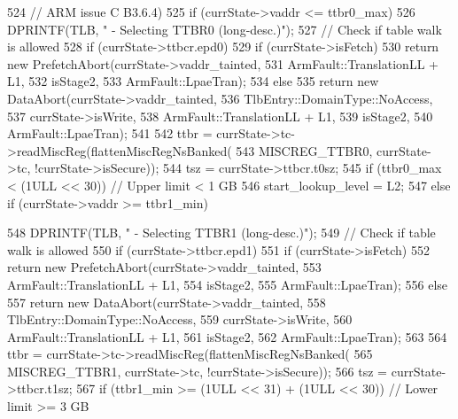 \begin{DoxyCode}
{{524         // ARM issue C B3.6.4)
525         if (currState->vaddr <= ttbr0_max) {
526             DPRINTF(TLB, " - Selecting TTBR0 (long-desc.)\n");
527             // Check if table walk is allowed
528             if (currState->ttbcr.epd0) {
529                 if (currState->isFetch)
530                     return new PrefetchAbort(currState->vaddr_tainted,
531                                              ArmFault::TranslationLL + L1,
532                                              isStage2,
533                                              ArmFault::LpaeTran);
534                 else
535                     return new DataAbort(currState->vaddr_tainted,
536                                          TlbEntry::DomainType::NoAccess,
537                                          currState->isWrite,
538                                          ArmFault::TranslationLL + L1,
539                                          isStage2,
540                                          ArmFault::LpaeTran);
541             }
542             ttbr = currState->tc->readMiscReg(flattenMiscRegNsBanked(
543                 MISCREG_TTBR0, currState->tc, !currState->isSecure));
544             tsz = currState->ttbcr.t0sz;
545             if (ttbr0_max < (1ULL << 30))  // Upper limit < 1 GB
546                 start_lookup_level = L2;
547         } else if (currState->vaddr >= ttbr1_min) {
548             DPRINTF(TLB, " - Selecting TTBR1 (long-desc.)\n");
549             // Check if table walk is allowed
550             if (currState->ttbcr.epd1) {
551                 if (currState->isFetch)
552                     return new PrefetchAbort(currState->vaddr_tainted,
553                                              ArmFault::TranslationLL + L1,
554                                              isStage2,
555                                              ArmFault::LpaeTran);
556                 else
557                     return new DataAbort(currState->vaddr_tainted,
558                                          TlbEntry::DomainType::NoAccess,
559                                          currState->isWrite,
560                                          ArmFault::TranslationLL + L1,
561                                          isStage2,
562                                          ArmFault::LpaeTran);
563             }
564             ttbr = currState->tc->readMiscReg(flattenMiscRegNsBanked(
565                 MISCREG_TTBR1, currState->tc, !currState->isSecure));
566             tsz = currState->ttbcr.t1sz;
567             if (ttbr1_min >= (1ULL << 31) + (1ULL << 30))  // Lower limit >= 3 GB
      
}}}
\end{DoxyCode}
